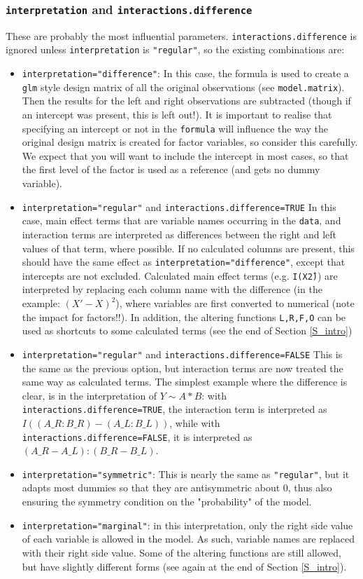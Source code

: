 \documentclass[12pt]{article}
\newcommand{\cd}[1]{\texttt{#1}}%
\begin{document}
\subsubsection{\cd{interpretation} and \cd{interactions.difference}}
These are probably the most influential parameters. \cd{interactions.difference} is ignored unless \cd{interpretation} is \cd{"regular"}, so the existing combinations are:
\begin{itemize}
	\item {\cd{interpretation="difference"}}: In this case, the formula is used to create a \cd{glm} style design matrix of all the original observations (see \cd{model.matrix}). Then the results for the left and right observations are subtracted (though if an intercept was present, this is left out!). It is important to realise that specifying an intercept or not in the \cd{formula} will influence the way the original design matrix is created for factor variables, so consider this carefully. We expect that you will want to include the intercept in most cases, so that the first level of the factor is used as a reference (and gets no dummy variable).
	\item {\cd{interpretation="regular"} and \cd{interactions.difference=TRUE}} In this case, main effect terms that are variable names occurring in the \cd{data}, and interaction terms are interpreted as differences between the right and left values of that term, where possible. If no calculated columns are present, this should have the same effect as \cd{interpretation="difference"}, except that intercepts are not excluded. Calculated main effect terms (e.g. \cd{I(X\^2)}) are interpreted by replacing each column name with the difference (in the example: \cd{$(X'-X)^2$}), where variables are first converted to numerical (note the impact for factors!!). In addition, the altering functions \cd{L,R,F,O} can be used as shortcuts to some calculated terms (see the end of Section \ref{S_intro})
	\item {\cd{interpretation="regular"} and \cd{interactions.difference=FALSE}} This is the same as the previous option, but interaction terms are now treated the same way as calculated terms. The simplest example where the difference is clear, is in the interpretation of $Y\sim A*B$: with \cd{interactions.difference=TRUE}, the interaction term is interpreted as $I((A\_R:B\_R)-(A\_L:B\_L))$, while with \cd{interactions.difference=FALSE}, it is interpreted as $(A\_R-A\_L):(B\_R-B\_L)$.
	\item {\cd{interpretation="symmetric"}: This is nearly the same as \cd{"regular"}, but it adapts most dummies so that they are antisymmetric about 0, thus also ensuring the symmetry condition on the "probability" of the model.}
	\item {\cd{interpretation="marginal"}}: in this interpretation, only the right side value of each variable is allowed in the model. As such, variable names are replaced with their right side value. Some of the altering functions are still allowed, but have slightly different forms (see again at the end of Section \ref{S_intro}).
\end{itemize}
\end{document}
